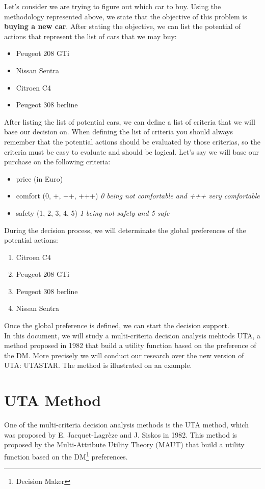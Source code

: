 \documentclass{report}
\begin{document}
Let's consider we are trying to figure out which car to buy. Using the methodology represented above, we state that the objective of this problem is \textbf{buying a new car}. After stating the objective, we can list the potential of actions that represent the list of cars that we may buy: 
\begin{itemize}
\item Peugeot 208 GTi
\item Nissan Sentra
\item Citroen C4
\item Peugeot 308 berline
\end{itemize}
After listing the list of potential cars, we can define a list of criteria that we will base our decision on. When defining the list of criteria you should always remember that the potential actions should be evaluated by those criterias, so the criteria must be easy to evaluate and should be logical. Let's say we will base our purchase on the following criteria:
\begin{itemize}
\item price (in Euro)
\item comfort (0, +, ++, +++) \textit{0 being not comfortable and +++ very comfortable}
\item safety (1, 2, 3, 4, 5) \textit{1 being not safety and 5 safe}
\end{itemize}
During the decision process, we will determinate the global preferences of the potential actions:
\begin{enumerate}
\item Citroen C4
\item Peugeot 208 GTi
\item Peugeot 308 berline
\item Nissan Sentra
\end{enumerate}
Once the global preference is defined, we can start the decision support.\\

In this document, we will study a multi-criteria decision analysis mehtods UTA, a method proposed in 1982 that build a utility function based on the preference of the DM. More precisely we will conduct our research over the new version of UTA: UTASTAR. The method is illustrated on an example.

\chapter{UTA Method}
One of the multi-criteria decision analysis methods is the UTA method, which was proposed by E. Jacquet-Lagrèze and J. Siskos in 1982. This method is proposed by the Multi-Attribute Utility Theory (MAUT) that build a utility function based on the DM\footnote{Decision Maker} preferences.\\
 
\end{document}
